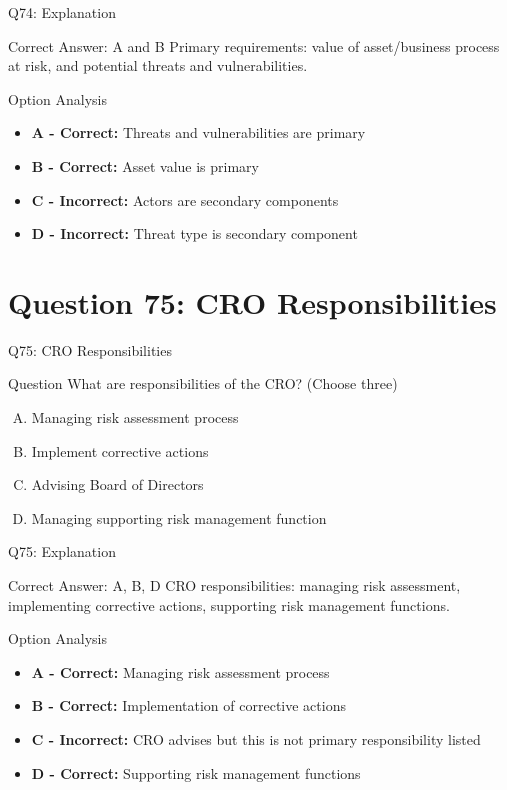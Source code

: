 \documentclass{beamer}
\begin{document}
	\begin{frame}{Q74: Explanation}
		\begin{block}{Correct Answer: A and B}
			Primary requirements: value of asset/business process at risk, and potential threats and vulnerabilities.
		\end{block}
		\begin{block}{Option Analysis}
			\begin{itemize}
				\item \textbf{A - Correct:} Threats and vulnerabilities are primary
				\item \textbf{B - Correct:} Asset value is primary
				\item \textbf{C - Incorrect:} Actors are secondary components
				\item \textbf{D - Incorrect:} Threat type is secondary component
			\end{itemize}
		\end{block}
	\end{frame}
	
	\section{Question 75: CRO Responsibilities}
	
	\begin{frame}{Q75: CRO Responsibilities}
		\begin{block}{Question}
			What are responsibilities of the CRO? (Choose three)
		\end{block}
		\begin{enumerate}[(A)]
			\item Managing risk assessment process
			\item Implement corrective actions
			\item Advising Board of Directors
			\item Managing supporting risk management function
		\end{enumerate}
	\end{frame}
	
	\begin{frame}{Q75: Explanation}
		\begin{block}{Correct Answer: A, B, D}
			CRO responsibilities: managing risk assessment, implementing corrective actions, supporting risk management functions.
		\end{block}
		\begin{block}{Option Analysis}
			\begin{itemize}
				\item \textbf{A - Correct:} Managing risk assessment process
				\item \textbf{B - Correct:} Implementation of corrective actions
				\item \textbf{C - Incorrect:} CRO advises but this is not primary responsibility listed
				\item \textbf{D - Correct:} Supporting risk management functions
			\end{itemize}
		\end{block}
	\end{frame}
	
\end{document}
